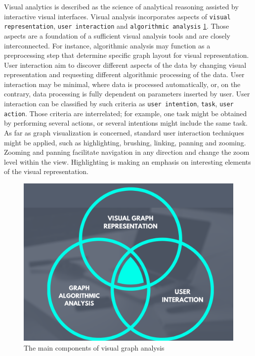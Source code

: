 \documentclass[thesis=B,english]{FITthesis}[2019/12/23]
\begin{document}
Visual analytics is described as the science of analytical reasoning assisted by interactive visual interfaces. Visual analysis incorporates aspects of \verb|visual representation|, \verb|user interaction| and \verb|algorithmic analysis| \ref{fig:float3}. Those aspects are a foundation of a sufficient visual analysis tools and are closely interconnected. For instance, algorithmic analysis may function as a preprocessing step that determine specific graph layout for visual representation. User interaction aim to discover different aspects of the data by changing visual representation and requesting different algorithmic processing of the data. User interaction may be minimal, where data is processed automatically, or, on the contrary, data processing is fully dependent on parameters inserted by user. User interaction can be classified by such criteria as \verb|user intention|, \verb|task|, \verb|user action|. Those criteria are interrelated; for example, one task might be obtained by performing several actions, or several intentions might include the same task. As far as graph visualization is concerned, standard user interaction techniques might be applied, such as highlighting, brushing, linking, panning and zooming. Zooming and panning facilitate navigation in any direction and change the zoom level within the view. Highlighting is making an emphasis on interesting elements of the visual representation.

\begin{figure}
	\includegraphics[scale=0.25]{visualgraphrepresentation.png}
	\caption[The main components of visual graph analysis]{The main components of visual graph analysis}\label{fig:float3}
\end{figure}
\end{document}
